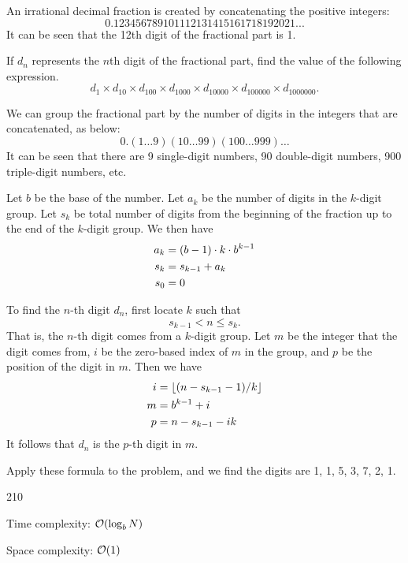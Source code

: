 





An irrational decimal fraction is created by concatenating the positive integers:
\[
0.123456789101112131415161718192021...
\]
It can be seen that the 12th digit of the fractional part is 1.

If $d_n$ represents the $n$th digit of the fractional part, find the value of the following expression.
\[ 
d_1 \times d_{10} \times d_{100} \times d_{1000} \times d_{10000} \times d_{100000} \times d_{1000000} .
\]

\solution

We can group the fractional part by the number of digits in the integers that are concatenated, as below:
\[
0.(1 \ldots 9)(10 \ldots 99)(100 \ldots 999) \ldots 
\]
It can be seen that there are 9 single-digit numbers, 90 double-digit numbers, 900 triple-digit numbers, etc.

Let $b$ be the base of the number. Let $a_k$ be the number of digits in the $k$-digit group. Let $s_k$ be total number of digits from the beginning of the fraction up to the end of the $k$-digit group. We then have
\begin{align}
a_k &= (b-1) \cdot k \cdot b^{k-1} \notag \\
s_k &= s_{k-1}+a_k \notag \\
s_0 &= 0 \notag
\end{align}

To find the $n$-th digit $d_n$, first locate $k$ such that
\[
s_{k-1} < n \le s_{k}.
\]
That is, the $n$-th digit comes from a $k$-digit group. Let $m$ be the integer that the digit comes from, $i$ be the zero-based index of $m$ in the group, and $p$ be the position of the digit in $m$. Then we have
\begin{align}
i &= \lfloor (n-s_{k-1}-1)/k \rfloor \notag \\
m &= b^{k-1} + i \notag \\
p &= n - s_{k-1} - ik \notag 
\end{align}
It follows that $d_n$ is the $p$-th digit in $m$.

Apply these formula to the problem, and we find the digits are 1, 1, 5, 3, 7, 2, 1.

\answer

210

\complexity

Time complexity: $\mathcal{O}(\log_b N)$

Space complexity: $\mathcal{O}(1)$

 